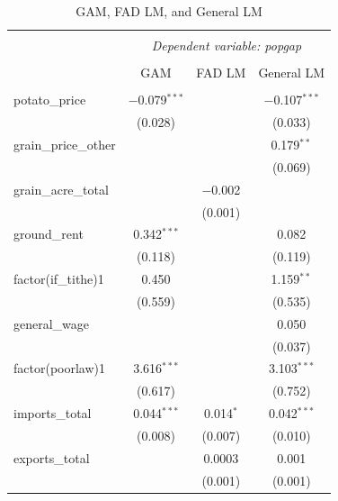 \begin{table}[h]
    \centering
    \caption{GAM, FAD LM, and General LM}
    \begin{tabular}{@{\extracolsep{5pt}}lccc}
    \\[-1.8ex]\hline
    \hline \\[-1.8ex]
    & \multicolumn{3}{c}{\textit{Dependent variable: popgap}} \\
    \cline{2-4}
    \\[-1.8ex] & GAM & FAD LM & General LM \\
    \hline \\[-1.8ex]
    potato\_price & $-$0.079$^{***}$ & & $-$0.107$^{***}$ \\
     & (0.028) & & (0.033) \\
    grain\_price\_other & &  & 0.179$^{**}$ \\
     & &  & (0.069) \\
    grain\_acre\_total & & $-$0.002 & \\
     & & (0.001) & \\
    ground\_rent & 0.342$^{***}$ & & 0.082 \\
     & (0.118) & & (0.119) \\
    factor(if\_tithe)1 & 0.450 & & 1.159$^{**}$ \\
     & (0.559) & & (0.535) \\
    general\_wage & & & 0.050 \\
     & & & (0.037) \\
    factor(poorlaw)1 & 3.616$^{***}$ & & 3.103$^{***}$ \\
     & (0.617) & & (0.752) \\
    imports\_total & 0.044$^{***}$ & 0.014$^{*}$ & 0.042$^{***}$ \\
     & (0.008) & (0.007) & (0.010) \\
    exports\_total & & 0.0003 & 0.001 \\
     & & (0.001) & (0.001) \\


\end{tabular}
\end{table}
